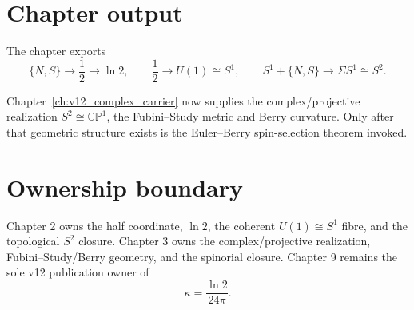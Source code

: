 \section{Chapter output}

The chapter exports
\begin{equation}
\boxed{
\{N,S\}
\to
\frac12
\to
\ln2,
\qquad
\frac12
\to
U(1)\cong S^1,
\qquad
S^1+\{N,S\}
\to
\Sigma S^1\cong S^2.
}
\label{eq:v12_ch2_output}
\end{equation}

Chapter~\ref{ch:v12_complex_carrier} now supplies the complex/projective realization $S^2\cong\mathbb{CP}^1$, the Fubini--Study metric and Berry curvature. Only after that geometric structure exists is the Euler--Berry spin-selection theorem invoked.

\section{Ownership boundary}

Chapter 2 owns the half coordinate, $\ln2$, the coherent $U(1)\cong S^1$ fibre, and the topological $S^2$ closure. Chapter 3 owns the complex/projective realization, Fubini--Study/Berry geometry, and the spinorial closure. Chapter 9 remains the sole v12 publication owner of
\[
\kappa=\frac{\ln2}{24\pi}.
\]
